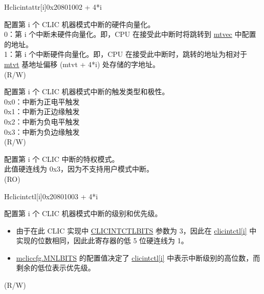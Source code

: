 \begin{register}{H}{{clicintattr[i]}}{0x20801002 + 4*i}\label{regdesc:MCLICINTATTR_REG_i}
%
%
%
%
\regnewline%
\begin{regdesc}
\begin{reglist}
\label{fielddesc:MCLICINTATTR_i_SHV}\item [{SHV}] 配置第 i 个 CLIC 机器模式中断的硬件向量化。 \\
0：第 i 个中断未硬件向量化。即，CPU 在接受此中断时将跳转到 \hyperref[fielddesc:MTVECBASE]{mtvec} 中配置的地址。 \\
1：第 i 个中断硬件向量化。即，CPU 在接受此中断时，跳转的地址为相对于 \hyperref[fielddesc:MTVTBASE]{mtvt} 基地址偏移 (mtvt + 4*i) 处存储的字地址。 \\
(R/W)
\label{fielddesc:MCLICINTATTR_i_TRIG}\item [{TRIG}] 配置第 i 个 CLIC 机器模式中断的触发类型和极性。 \\
0x0：中断为正电平触发 \\
0x1：中断为正边缘触发 \\
0x2：中断为负电平触发 \\
0x3：中断为负边缘触发 \\
(R/W)
\label{fielddesc:MCLICINTATTR_i_MODE}\item [{MODE}] 配置第 i 个 CLIC 中断的特权模式。 \\
此值硬连线为 0x3，因为不支持用户模式中断。\\
(RO)
\end{reglist}
\end{regdesc}
\end{register}

\begin{register}{H}{{clicintctl[i]}}{0x20801003 + 4*i}\label{regdesc:MCLICINTCTL_REG_i}
%
%
\regnewline%
\begin{regdesc}
\begin{reglist}
\label{fielddesc:MCLICINTCTL_i}\item [{CTL[i]}] 配置第 i 个 CLIC 机器模式中断的级别和优先级。 \\
\begin{itemize}
    \item 由于在此 CLIC 实现中 \hyperref[fielddesc:CLICINFO_CLICINTCTLBITS]{CLICINTCTLBITS} 参数为 3，因此在 \hyperref[regdesc:MCLICINTCTL_REG_i]{clicintctl[i]} 中实现的位数相同，因此此寄存器的低 5 位硬连线为 1。 \\
    \item \hyperref[fielddesc:MCLICCFG_MNLBITS]{mcliccfg.MNLBITS} 的配置值决定了 \hyperref[regdesc:MCLICINTCTL_REG_i]{clicintctl[i]} 中表示中断级别的高位数，而剩余的低位表示优先级。
\end{itemize}
(R/W)
\end{reglist}
\end{regdesc}
\end{register}
